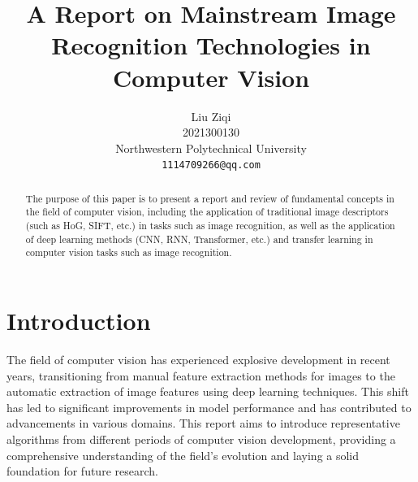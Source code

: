 \documentclass[10pt,twocolumn,letterpaper]{article}
\begin{document}
\title{A Report on Mainstream Image Recognition Technologies in Computer Vision }

\author{Liu Ziqi\\
2021300130\\
Northwestern Polytechnical University\\
{\tt\small 1114709266@qq.com}
}
\maketitle

\begin{abstract}
  The purpose of this paper is to present a report and review of fundamental concepts in the field of computer vision, including the application of traditional image descriptors (such as HoG, SIFT, etc.) in tasks such as image recognition, as well as the application of deep learning methods (CNN, RNN, Transformer, etc.) and transfer learning in computer vision tasks such as image recognition.
\end{abstract}

\section{Introduction}
\label{sec:intro}

The field of computer vision has experienced explosive development in recent years, transitioning from manual feature extraction methods for images to the automatic extraction of image features using deep learning techniques. This shift has led to significant improvements in model performance and has contributed to advancements in various domains. This report aims to introduce representative algorithms from different periods of computer vision development, providing a comprehensive understanding of the field's evolution and laying a solid foundation for future research.
\end{document}
